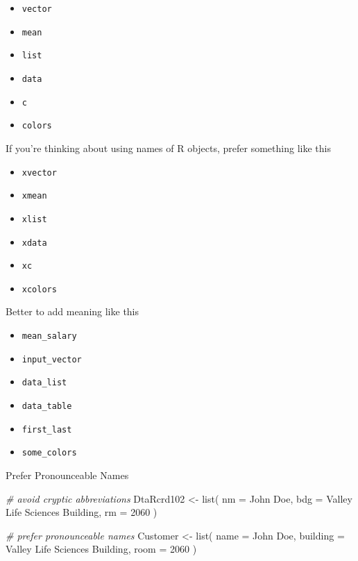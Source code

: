 \documentclass[
]{book}
\newenvironment{Shaded}{\begin{snugshade}}{\end{snugshade}}
\newcommand{\AttributeTok}[1]{\textcolor[rgb]{0.77,0.63,0.00}{#1}}
\newcommand{\CommentTok}[1]{\textcolor[rgb]{0.56,0.35,0.01}{\textit{#1}}}
\newcommand{\DecValTok}[1]{\textcolor[rgb]{0.00,0.00,0.81}{#1}}
\newcommand{\FunctionTok}[1]{\textcolor[rgb]{0.00,0.00,0.00}{#1}}
\newcommand{\NormalTok}[1]{#1}
\newcommand{\OtherTok}[1]{\textcolor[rgb]{0.56,0.35,0.01}{#1}}
\newcommand{\StringTok}[1]{\textcolor[rgb]{0.31,0.60,0.02}{#1}}
\providecommand{\tightlist}{%
  \setlength{\itemsep}{0pt}\setlength{\parskip}{0pt}}
\begin{document}
\begin{itemize}
\tightlist
\item
  \texttt{vector}
\item
  \texttt{mean}
\item
  \texttt{list}
\item
  \texttt{data}
\item
  \texttt{c}
\item
  \texttt{colors}
\end{itemize}

If you're thinking about using names of R objects, prefer something like this

\begin{itemize}
\tightlist
\item
  \texttt{xvector}
\item
  \texttt{xmean}
\item
  \texttt{xlist}
\item
  \texttt{xdata}
\item
  \texttt{xc}
\item
  \texttt{xcolors}
\end{itemize}

Better to add meaning like this

\begin{itemize}
\tightlist
\item
  \texttt{mean\_salary}
\item
  \texttt{input\_vector}
\item
  \texttt{data\_list}
\item
  \texttt{data\_table}
\item
  \texttt{first\_last}
\item
  \texttt{some\_colors}
\end{itemize}

Prefer Pronounceable Names

\begin{Shaded}
\begin{Highlighting}[]
\CommentTok{\# avoid cryptic abbreviations}
\NormalTok{DtaRcrd102 }\OtherTok{\textless{}{-}} \FunctionTok{list}\NormalTok{(}
  \AttributeTok{nm =} \StringTok{\textquotesingle{}John Doe\textquotesingle{}}\NormalTok{,}
  \AttributeTok{bdg =} \StringTok{\textquotesingle{}Valley Life Sciences Building\textquotesingle{}}\NormalTok{,}
  \AttributeTok{rm =} \DecValTok{2060}
\NormalTok{)}


\CommentTok{\# prefer pronounceable names }
\NormalTok{Customer }\OtherTok{\textless{}{-}} \FunctionTok{list}\NormalTok{(}
  \AttributeTok{name =} \StringTok{\textquotesingle{}John Doe\textquotesingle{}}\NormalTok{,}
  \AttributeTok{building =} \StringTok{\textquotesingle{}Valley Life Sciences Building\textquotesingle{}}\NormalTok{,}
  \AttributeTok{room =} \DecValTok{2060}
\NormalTok{)}
\end{Highlighting}
\end{Shaded}
\end{document}
